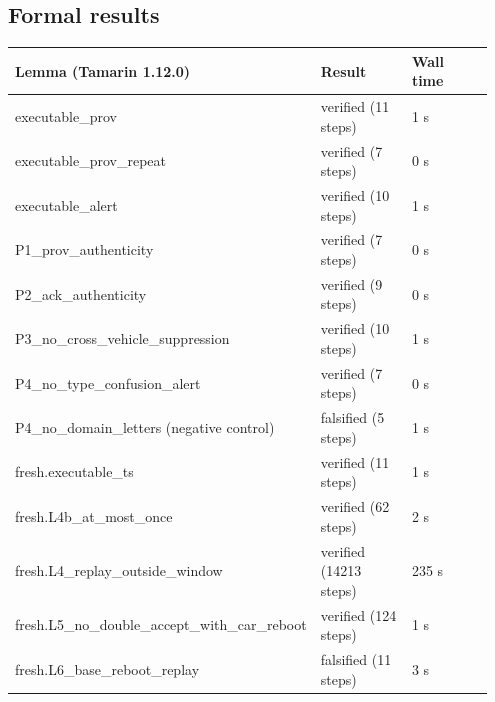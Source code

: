 \subsection*{Formal results}

{\scriptsize\raggedright
\begin{longtable}{p{0.317\linewidth}p{0.317\linewidth}p{0.317\linewidth}}
\toprule
Lemma (Tamarin 1.12.0) & Result & Wall time \\
\midrule
\endhead
executable\_prov & verified (11 steps) & 1 s \\
executable\_prov\_repeat & verified (7 steps) & 0 s \\
executable\_alert & verified (10 steps) & 1 s \\
P1\_prov\_authenticity & verified (7 steps) & 0 s \\
P2\_ack\_authenticity & verified (9 steps) & 0 s \\
P3\_no\_cross\_vehicle\_suppression & verified (10 steps) & 1 s \\
P4\_no\_type\_confusion\_alert & verified (7 steps) & 0 s \\
P4\_no\_domain\_letters (negative control) & falsified (5 steps) & 1 s \\
fresh.executable\_ts & verified (11 steps) & 1 s \\
fresh.L4b\_at\_most\_once & verified (62 steps) & 2 s \\
fresh.L4\_replay\_outside\_window & verified (14213 steps) & 235 s \\
fresh.L5\_no\_double\_accept\_with\_car\_reboot & verified (124 steps) & 1 s \\
fresh.L6\_base\_reboot\_replay & falsified (11 steps) & 3 s \\
\bottomrule
\end{longtable}}

